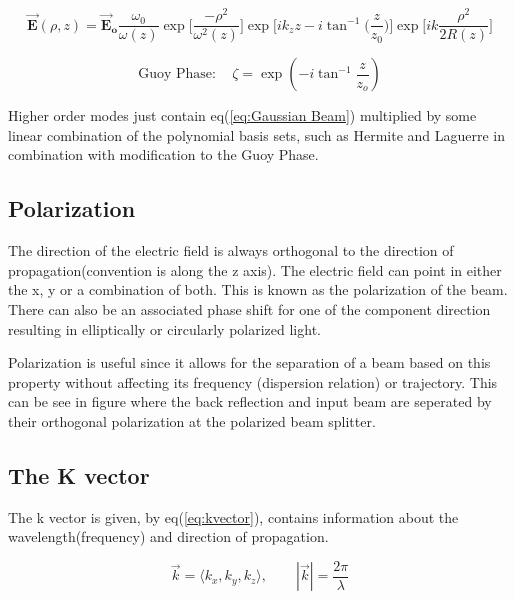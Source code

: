 \documentclass[a4paper]{book}
\begin{document}
			\begin{equation}
				\label {eq:Gaussian Beam}
				\vec{\textbf{E}}(\rho,z)=\vec{\textbf{E}}_\textbf{o}\frac{\omega_{0}}{\omega(z)} \exp\bigg[\dfrac{-\rho^2}{\omega^2(z)}\bigg] \exp\bigg[ik_z z - i \tan^{-1}\bigg(\frac{z}{z_0}\bigg)\bigg]\exp\bigg[ik \dfrac{\rho^2}{2R(z)}\bigg]
			\end{equation}
			
			\begin{equation}
				\label {eq:Guoy Phase}
				\text{Guoy Phase}:\quad \zeta = \exp\left(-i\tan^{-1}{\dfrac{z}{z_o}}\right)
			\end{equation}
			
			Higher order modes just contain eq(\ref{eq:Gaussian Beam}) multiplied by some linear combination of the polynomial basis sets, such as Hermite and Laguerre in combination with modification to the Guoy Phase.
		
		\subsection{Polarization}
			\label{subsec:Polarization}
			The direction of the electric field is always orthogonal to the direction of propagation(convention is along the z axis). The electric field can point in either the x, y or a combination of both. This is known as the polarization of the beam. There can also be an associated phase shift for one of the component direction resulting in elliptically or circularly polarized light.
			
			Polarization is useful since it allows for the separation of a beam based on this property without affecting its frequency (dispersion relation) or trajectory. This can be see in figure %
	 where the back reflection and input beam are seperated by their orthogonal polarization at the polarized beam splitter.
			
		\subsection{The K vector}
			\label{subsec:The K vector}
			The k vector is given, by eq(\ref{eq:kvector}), contains information about the wavelength(frequency) and direction of propagation.
			
			\begin{equation} 
				\label{eq:kvector}
				\vec{k} = \langle k_x,k_y,k_z \rangle, \qquad |\vec{k}|=\dfrac{2\pi}{\lambda}
			\end{equation} 
		
\end{document}
